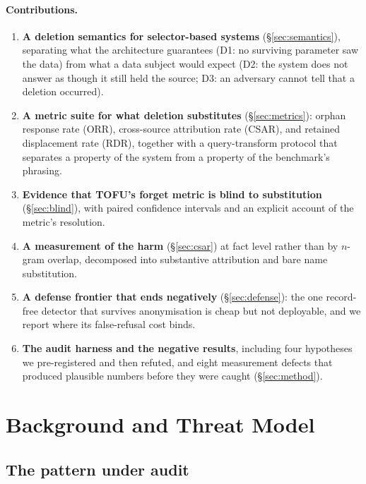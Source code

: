 \documentclass[11pt]{article}
\newcommand{\csar}{CSAR}
\newcommand{\orr}{ORR}
\newcommand{\rdr}{RDR}
\begin{document}
\paragraph{Contributions.}
\begin{enumerate}
  \item \textbf{A deletion semantics for selector-based systems} (\S\ref{sec:semantics}), separating
        what the architecture guarantees (D1: no surviving parameter saw the data) from what a data
        subject would expect (D2: the system does not answer as though it still held the source;
        D3: an adversary cannot tell that a deletion occurred).
  \item \textbf{A metric suite for what deletion substitutes} (\S\ref{sec:metrics}): orphan response
        rate (\orr{}), cross-source attribution rate (\csar{}), and retained displacement rate
        (\rdr{}), together with a query-transform protocol that separates a property of the system
        from a property of the benchmark's phrasing.
  \item \textbf{Evidence that TOFU's forget metric is blind to substitution}
        (\S\ref{sec:blind}), with paired confidence intervals and an explicit account of the
        metric's resolution.
  \item \textbf{A measurement of the harm} (\S\ref{sec:csar}) at fact level rather than by $n$-gram
        overlap, decomposed into substantive attribution and bare name substitution.
  \item \textbf{A defense frontier that ends negatively} (\S\ref{sec:defense}): the one
        record-free detector that survives anonymisation is cheap but not deployable, and we
        report where its false-refusal cost binds.
  \item \textbf{The audit harness and the negative results}, including four hypotheses we
        pre-registered and then refuted, and eight measurement defects that produced plausible
        numbers before they were caught (\S\ref{sec:method}).
\end{enumerate}

\section{Background and Threat Model}
\label{sec:background}

\subsection{The pattern under audit}
\end{document}
